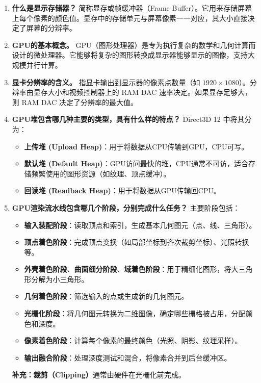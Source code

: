 \documentclass[UTF8]{ctexart}
\begin{document}
\begin{enumerate}
    \item \textbf{什么是显示存储器？}
    简称显存或帧缓冲器（Frame Buffer）。它用来存储屏幕上每个像素的颜色值。显存中的存储单元与屏幕像素一一对应，其大小直接决定了屏幕的分辨率。

    \item \textbf{GPU的基本概念。}
    GPU（图形处理器）是专为执行复杂的数学和几何计算而设计的微处理器。它能够将复杂的图形转换成显示器能够显示的图像，支持大规模并行计算。

    \item \textbf{显卡分辨率的含义。}
    指显卡输出到显示器的像素点数量（如 $1920 \times 1080$）。分辨率由显存大小和视频控制器上的 RAM DAC 速率决定。如果显存足够大，则 RAM DAC 决定了分辨率的最大值。

    \item \textbf{GPU堆包含哪几种主要的类型，具有什么样的特点？}
    Direct3D 12 中将其分为：
    \begin{itemize}
        \item \textbf{上传堆 (Upload Heap)}：用于将数据从CPU传输到GPU，CPU可写。
        \item \textbf{默认堆 (Default Heap)}：GPU访问最快的堆，CPU通常不可访，适合存储频繁使用的图形资源（如纹理、顶点缓冲）。
        \item \textbf{回读堆 (Readback Heap)}：用于将数据从GPU传输回CPU。
    \end{itemize}

    \item \textbf{GPU渲染流水线包含哪几个阶段，分别完成什么任务？}
    主要阶段包括：
    \begin{itemize}
        \item \textbf{输入装配阶段}：读取顶点和索引，生成基本几何图元（点、线、三角形）。
        \item \textbf{顶点着色阶段}：完成顶点变换（如局部坐标到齐次裁剪坐标）、光照转换等。
        \item \textbf{外壳着色阶段}、\textbf{曲面细分阶段}、\textbf{域着色阶段}：用于精细化图形，将大三角形分解为小三角形。
        \item \textbf{几何着色阶段}：筛选输入的点或生成新的几何图元。
        \item \textbf{光栅化阶段}：将几何图元转换为二维图像，确定哪些栅格被占用，分配颜色和深度。
        \item \textbf{像素着色阶段}：计算每个像素的最终颜色（光照、阴影、纹理采样）。
        \item \textbf{输出融合阶段}：处理深度测试和混合，将像素合并到后台缓冲区。
    \end{itemize}
    \textbf{补充：裁剪（Clipping）}通常由硬件在光栅化前完成。


\end{enumerate}
\end{document}
